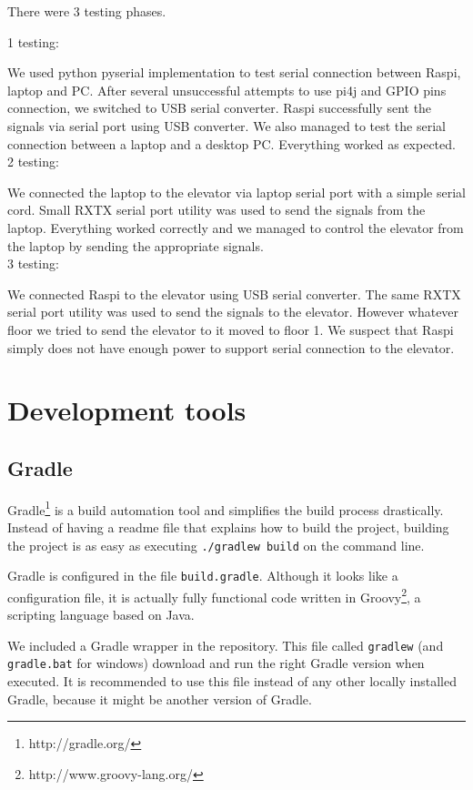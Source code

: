 \documentclass[a4paper, 12pt]{article}
\begin{document}
There were 3 testing phases.

1 testing:

We used python pyserial implementation to test serial connection between Raspi, laptop and PC.
After several unsuccessful attempts to use pi4j and GPIO pins connection, we switched to USB serial converter.
Raspi successfully sent the signals via serial port using USB converter.
We also managed to test the serial connection between a laptop and a desktop PC.
Everything worked as expected.
\\

2 testing:

We connected the laptop to the elevator via laptop serial port with a simple serial cord.
Small RXTX serial port utility was used to send the signals from the laptop.
Everything worked correctly and we managed to control the elevator from the laptop by sending the appropriate signals.
\\

3 testing:

We connected Raspi to the elevator using USB serial converter.
The same RXTX serial port utility was used to send the signals to the elevator.
However whatever floor we tried to send the elevator to it moved to floor 1. 
We suspect that Raspi simply does not have enough power to support serial connection to the elevator.


\newpage
\section{Development tools}
\label{sec:Development_tools}
\subsection{Gradle}
Gradle\footnote{http://gradle.org/} is a build automation tool and simplifies the build process drastically.
Instead of having a readme file that explains how to build the project, building the project is as easy as executing \texttt{./gradlew build} on the command line.

Gradle is configured in the file \texttt{build.gradle}.
Although it looks like a configuration file, it is actually fully functional code written in Groovy\footnote{http://www.groovy-lang.org/}, a scripting language based on Java.

We included a Gradle wrapper in the repository.
This file called \texttt{gradlew} (and \texttt{gradle.bat} for windows) download and run the right Gradle version when executed.
It is recommended to use this file instead of any other locally installed Gradle, because it might be another version of Gradle.
\end{document}
